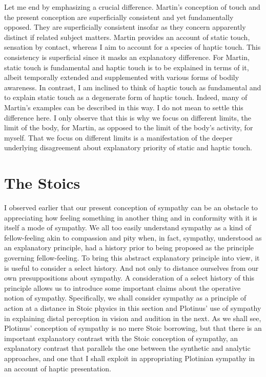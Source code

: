 Let me end by emphasizing a crucial difference. Martin's \citeyearpar{Martin:1992aa} conception of touch and the present conception are superficially consistent and yet fundamentally opposed. They are superficially consistent insofar as they concern apparently distinct if related subject matters. Martin provides an account of static touch, sensation by contact, whereas I aim to account for a species of haptic touch. This consistency is superficial since it masks an explanatory difference. For Martin, static touch is fundamental and haptic touch is to be explained in terms of it, albeit temporally extended and supplemented with various forms of bodily awareness. In contrast, I am inclined to think of haptic touch as fundamental and to explain static touch as a degenerate form of haptic touch. Indeed, many of Martin's examples can be described in this way. I do not mean to settle this difference here. I only observe that this is why we focus on different limits, the limit of the body, for Martin, as opposed to the limit of the body's activity, for myself. That we focus on different limits is a manifestation of the deeper underlying disagreement about explanatory priority of static and haptic touch.



\section{The Stoics} %
\label{sec:the_stoics}

I observed earlier that our present conception of sympathy can be an obstacle to appreciating how feeling something in another thing and in conformity with it is itself a mode of sympathy. We all too easily understand sympathy as a kind of fellow-feeling akin to compassion and pity when, in fact, sympathy, understood as an explanatory principle, had a history prior to being proposed as the principle governing fellow-feeling. To bring this abstract explanatory principle into view, it is useful to consider a select history. And not only to distance ourselves from our own presuppositions about sympathy. A consideration of a select history of this principle allows us to introduce some important claims about the operative notion of sympathy. Specifically, we shall consider sympathy as a principle of action at a distance in Stoic physics in this section and Plotinus' use of sympathy in explaining distal perception in vision and audition in the next. As we shall see, Plotinus' conception of sympathy is no mere Stoic borrowing, but that there is an important explanatory contrast with the Stoic conception of sympathy, an explanatory contrast that parallels the one between the synthetic and analytic approaches, and one that I shall exploit in appropriating Plotinian sympathy in an account of haptic presentation.

